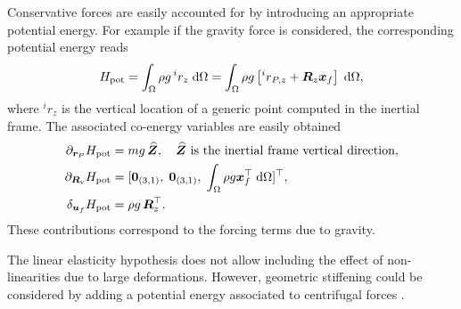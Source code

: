\documentclass{svjour3}                     %
\begin{document}
	
	\begin{remark}
		Conservative forces are easily accounted for by introducing an appropriate potential energy. For example if the gravity force is considered, the corresponding potential energy reads
		\begin{equation*}
		H_{\text{pot}} = \int_{\Omega} \rho g \, ^i r_z \d{\Omega} = \int_{\Omega} \rho g \left[ ^i r_{P, z} +\bm{R}_z \bm{x}_f \right] \d{\Omega},
		\end{equation*}
		where $^i r_z$ is the vertical location of a generic point computed in the inertial frame. The associated co-energy variables are easily obtained
		\begin{align*}
		\partial_{\bm{r}_P}H_{\text{pot}} &= m g \, \widehat{\bm{Z}}, \quad \text{$\widehat{\bm{Z}}$ is the inertial frame vertical direction},\\
		\partial_{\bm{R}_\text{v}}H_{\text{pot}} &= [\bm{0}_{(3, 1)}, \; \bm{0}_{(3, 1)}, \; \int_{\Omega} \rho g \bm{x}_f^\top \d{\Omega}]^\top, \\
		\delta_{\bm{u}_f} H_{\text{pot}} &= \rho g \, \bm{R}_z^\top.
		\end{align*}
		These contributions correspond to the forcing terms due to gravity.
	\end{remark}
	
	\begin{remark}
		The linear elasticity hypothesis does not allow including the effect of non-linearities due to large deformations.  However, geometric stiffening could be considered by adding a potential energy associated to centrifugal forces \cite{MB_Daepde}. 
	\end{remark}
	
\end{document}
